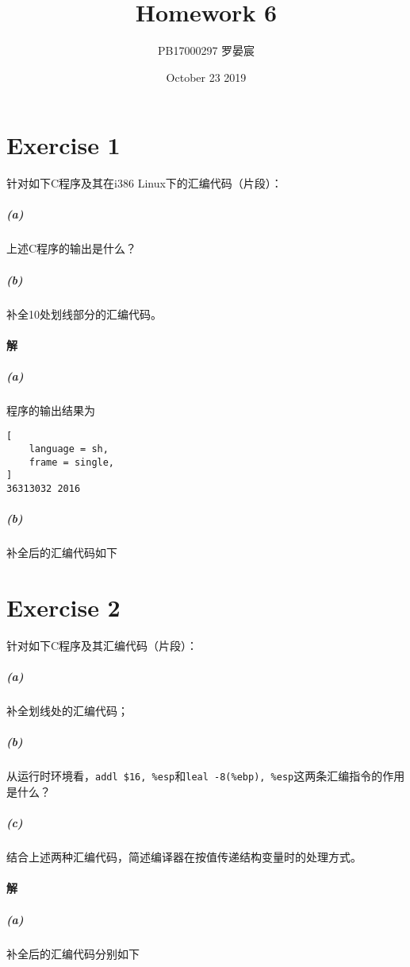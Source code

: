 \documentclass{article}
\title{Homework 6}
\author{PB17000297 罗晏宸}
\date{October 23 2019}
\newcommand{\CodeBlock}[2]{
    \begin{figure}[H]
        \begin{mdframed}[
            style = Default,
        ]
            
        \end{mdframed}
    \end{figure}
}
\begin{document}
\maketitle

\section*{Exercise 1}
针对如下C程序及其在i386 Linux下的汇编代码（片段）：

\begin{multicols}{2}
\CodeBlock{C}{./Ex1.c}
\subparagraph*{(a)}
上述C程序的输出是什么？
\subparagraph*{(b)}
补全10处划线部分的汇编代码。
\CodeBlock{Assembler}{./Ex1_Unfilled.s}
\end{multicols}

\paragraph{解}
\subparagraph*{(a)}
程序的输出结果为
\begin{lstlisting}[
    language = sh,
    frame = single,
]
36313032 2016
\end{lstlisting}
\subparagraph*{(b)}
补全后的汇编代码如下
\CodeBlock{Assembler}{./Ex1_Filled.s}

\newpage

\section*{Exercise 2}
针对如下C程序及其汇编代码（片段）：
\subparagraph*{(a)}
补全划线处的汇编代码；
\subparagraph*{(b)}
从运行时环境看，\lstinline[style = Assembler]{addl $16, %esp}和\lstinline[style = Assembler]{leal -8(%ebp), %esp}这两条汇编指令的作用是什么？
\subparagraph*{(c)}
结合上述两种汇编代码，简述编译器在按值传递结构变量时的处理方式。

\begin{multicols}{2}
\CodeBlock{C}{./Ex2.c}

\CodeBlock{Assembler}{./Ex2_N=2.s}

\CodeBlock{Assembler}{./Ex2_N=11.s}
\end{multicols}

\vspace{5em}

\paragraph{解}
\subparagraph*{(a)}
补全后的汇编代码分别如下
\end{document}
